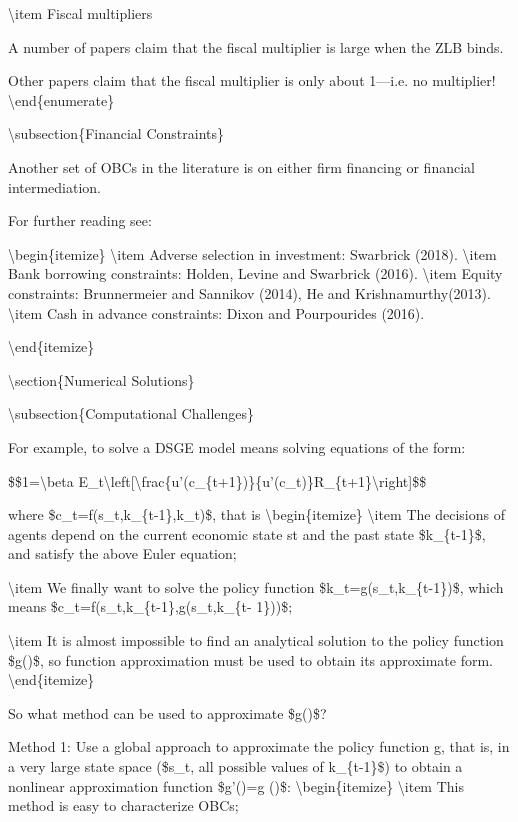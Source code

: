 \documentclass[10pt,math=newtx,citestyle=gb7714-2015,bibstyle=gb7714-2015]{elegantbook}
\begin{document}
	\textbackslash{}item Fiscal multipliers
	
	A number of papers claim that the fiscal multiplier is large when the ZLB binds.
	
	Other papers claim that the fiscal multiplier is only about 1---i.e. no multiplier!
	\textbackslash{}end\{enumerate\}
	
	\textbackslash{}subsection\{Financial Constraints\}
	
	Another set of OBCs in the literature is on either firm financing or financial intermediation.
	
	For further reading see:
	
	\textbackslash{}begin\{itemize\}
	\textbackslash{}item Adverse selection in investment: Swarbrick (2018).
	\textbackslash{}item Bank borrowing constraints: Holden, Levine and Swarbrick (2016).
	\textbackslash{}item Equity constraints: Brunnermeier and Sannikov (2014), He and Krishnamurthy(2013).
	\textbackslash{}item Cash in advance constraints: Dixon and Pourpourides (2016).
	
	\textbackslash{}end\{itemize\}
	
	\textbackslash{}section\{Numerical Solutions\}
	
	\textbackslash{}subsection\{Computational Challenges\}
	
	For example, to solve a DSGE model means solving equations of the form:
	
	\$\$1=\textbackslash{}beta E\_t\textbackslash{}left[\textbackslash{}frac\{u'(c\_\{t+1\})\}\{u'(c\_t)\}R\_\{t+1\}\textbackslash{}right]\$\$
	
	where \$c\_t=f(s\_t,k\_\{t-1\},k\_t)\$, that is 
	\textbackslash{}begin\{itemize\}
	\textbackslash{}item The decisions of agents depend on the current economic state st and the past state \$k\_\{t-1\}\$, and satisfy the above Euler equation;
	
	\textbackslash{}item We finally want to solve the policy function \$k\_t=g(s\_t,k\_\{t-1\})\$, which means \$c\_t=f(s\_t,k\_\{t-1\},g(s\_t,k\_\{t- 1\}))\$;
	
	\textbackslash{}item It is almost impossible to find an analytical solution to the policy function \$g()\$, so function approximation must be used to obtain its approximate form.
	\textbackslash{}end\{itemize\}
	
	So what method can be used to approximate \$g()\$?
	
	Method 1: Use a global approach to approximate the policy function g, that is, in a very large state space (\$s\_t, all possible values of k\_\{t-1\}\$) to obtain a nonlinear approximation function \$g'()=g ()\$:
	\textbackslash{}begin\{itemize\}
	\textbackslash{}item This method is easy to characterize OBCs;
	
\end{document}
